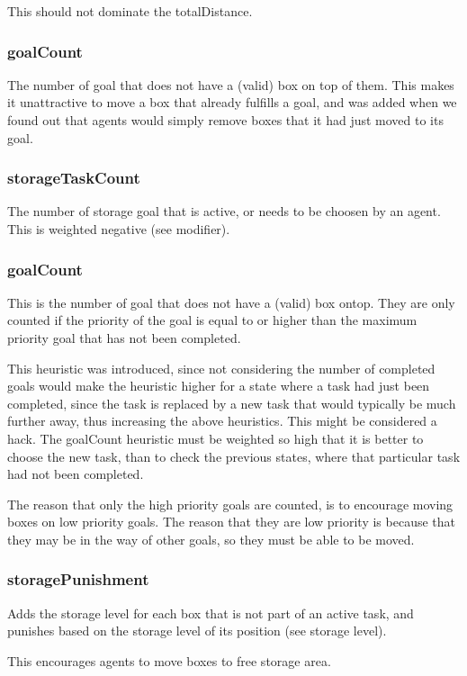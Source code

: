 \documentclass[letterpaper]{article}
\begin{document}
This should not dominate the totalDistance.

\subsubsection{goalCount}
The number of goal that does not have a (valid) box on top of them. This makes it
unattractive to move a box that already fulfills a goal, and was added when we found
out that agents would simply remove boxes that it had just moved to its goal.

\subsubsection{storageTaskCount}
The number of storage goal that is active, or needs to be choosen by an agent.
This is weighted negative (see modifier).

\subsubsection{goalCount}
This is the number of goal that does not have a (valid) box ontop. They are only
counted if the priority of the goal is equal to or higher than the maximum priority
goal that has not been completed.

This heuristic was introduced, since not considering the number of completed goals
would make the heuristic higher for a state where a task had just been completed,
since the task is replaced by a new task that would typically be much further away,
thus increasing the above heuristics. This might be considered a hack. The goalCount
heuristic must be weighted so high that it is better to choose the new task, than to
check the previous states, where that particular task had not been completed.

The reason that only the high priority goals are counted, is to encourage moving
boxes on low priority goals. The reason that they are low priority is because that
they may be in the way of other goals, so they must be able to be moved.

\subsubsection{storagePunishment}
Adds the storage level for each box that is not part of an active task, and
punishes based on the storage level of its position (see storage level).

This encourages agents to move boxes to free storage area.
\end{document}
